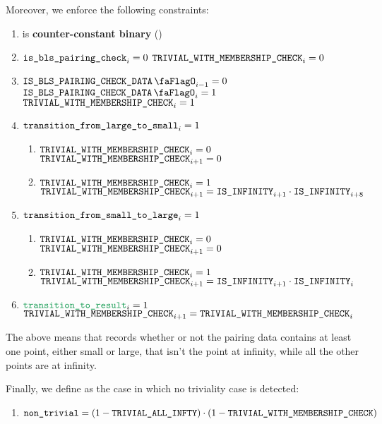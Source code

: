 Moreover, we enforce the following constraints:
\begin{enumerate}
    \item \trivialWithMembershipCheck{} is \textbf{counter-constant binary} \quad (\trash)
    \item \If $\texttt{is\_bls\_pairing\_check} _{i} = 0$ \Then $\texttt{TRIVIAL\_WITH\_MEMBERSHIP\_CHECK} _{i} = 0$
    \item \If $\isBlsPairingCheckData_{i - 1} = 0$ \et $\isBlsPairingCheckData _{i} = 1$ \Then $\texttt{TRIVIAL\_WITH\_MEMBERSHIP\_CHECK}_{i} = 1$
    \item \If $\texttt{transition\_from\_large\_to\_small}_{i} = 1$ \Then 
          \begin{enumerate}
              \item \If $\texttt{TRIVIAL\_WITH\_MEMBERSHIP\_CHECK} _{i} = 0$ \Then $\texttt{TRIVIAL\_WITH\_MEMBERSHIP\_CHECK} _{i + 1} = 0$
              \item \If $\texttt{TRIVIAL\_WITH\_MEMBERSHIP\_CHECK} _{i} = 1$ \Then $\texttt{TRIVIAL\_WITH\_MEMBERSHIP\_CHECK} _{i + 1} = \texttt{IS\_INFINITY}_{i + 1} \cdot \texttt{IS\_INFINITY}_{i + 8}$
          \end{enumerate}
    \item \If $\texttt{transition\_from\_small\_to\_large}_{i} = 1$ \Then
          \begin{enumerate}
              \item \If $\texttt{TRIVIAL\_WITH\_MEMBERSHIP\_CHECK} _{i} = 0$ \Then $\texttt{TRIVIAL\_WITH\_MEMBERSHIP\_CHECK} _{i + 1} = 0$
              \item \If $\texttt{TRIVIAL\_WITH\_MEMBERSHIP\_CHECK} _{i} = 1$ \Then $\texttt{TRIVIAL\_WITH\_MEMBERSHIP\_CHECK} _{i + 1} = \texttt{IS\_INFINITY}_{i + 1} \cdot \texttt{IS\_INFINITY}_{i}$
          \end{enumerate}
    \item \If $\locTransitionToResult_{i} = 1$ \Then $\texttt{TRIVIAL\_WITH\_MEMBERSHIP\_CHECK}_{i+1} = \texttt{TRIVIAL\_WITH\_MEMBERSHIP\_CHECK}_{i}$
\end{enumerate}
\saNote{} The above means that \trivialWithMembershipCheck{} records whether or not the pairing data contains at least one point, either small or large, that isn't the point at infinity, while all the other points are at infinity.

Finally, we define \locNonTrivial{} as the case in which no triviality case is detected:
\begin{enumerate}
    \item $\texttt{non\_trivial} = (1 - \texttt{TRIVIAL\_ALL\_INFTY}) \cdot (1 - \texttt{TRIVIAL\_WITH\_MEMBERSHIP\_CHECK})$
\end{enumerate}

